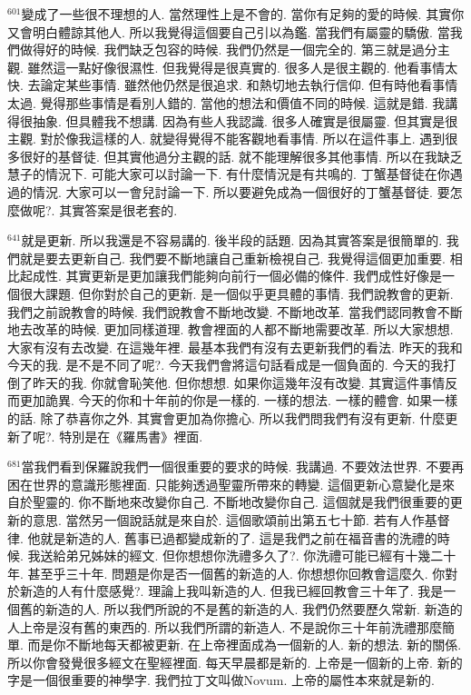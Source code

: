 \documentclass{book}
\begin{document}
$^{601}$變成了一些很不理想的人.
當然理性上是不會的.
當你有足夠的愛的時候.
其實你又會明白體諒其他人.
所以我覺得這個要自己引以為鑑.
當我們有屬靈的驕傲.
當我們做得好的時候.
我們缺乏包容的時候.
我們仍然是一個完全的.
第三就是過分主觀.
雖然這一點好像很濕性.
但我覺得是很真實的.
很多人是很主觀的.
他看事情太快.
去論定某些事情.
雖然他仍然是很追求.
和熱切地去執行信仰.
但有時他看事情太過.
覺得那些事情是看別人錯的.
當他的想法和價值不同的時候.
這就是錯.
我講得很抽象.
但具體我不想講.
因為有些人我認識.
很多人確實是很屬靈.
但其實是很主觀.
對於像我這樣的人.
就變得覺得不能客觀地看事情.
所以在這件事上.
遇到很多很好的基督徒.
但其實他過分主觀的話.
就不能理解很多其他事情.
所以在我缺乏慧子的情況下.
可能大家可以討論一下.
有什麼情況是有共鳴的.
丁蟹基督徒在你遇過的情況.
大家可以一會兒討論一下.
所以要避免成為一個很好的丁蟹基督徒.
要怎麼做呢?.
其實答案是很老套的.

$^{641}$就是更新.
所以我還是不容易講的.
後半段的話題.
因為其實答案是很簡單的.
我們就是要去更新自己.
我們要不斷地讓自己重新檢視自己.
我覺得這個更加重要.
相比起成性.
其實更新是更加讓我們能夠向前行一個必備的條件.
我們成性好像是一個很大課題.
但你對於自己的更新.
是一個似乎更具體的事情.
我們說教會的更新.
我們之前說教會的時候.
我們說教會不斷地改變.
不斷地改革.
當我們認同教會不斷地去改革的時候.
更加同樣道理.
教會裡面的人都不斷地需要改革.
所以大家想想.
大家有沒有去改變.
在這幾年裡.
最基本我們有沒有去更新我們的看法.
昨天的我和今天的我.
是不是不同了呢?.
今天我們會將這句話看成是一個負面的.
今天的我打倒了昨天的我.
你就會恥笑他.
但你想想.
如果你這幾年沒有改變.
其實這件事情反而更加詭異.
今天的你和十年前的你是一樣的.
一樣的想法.
一樣的體會.
如果一樣的話.
除了恭喜你之外.
其實會更加為你擔心.
所以我們問我們有沒有更新.
什麼更新了呢?.
特別是在《羅馬書》裡面.

$^{681}$當我們看到保羅說我們一個很重要的要求的時候.
我講過.
不要效法世界.
不要再困在世界的意識形態裡面.
只能夠透過聖靈所帶來的轉變.
這個更新心意變化是來自於聖靈的.
你不斷地來改變你自己.
不斷地改變你自己.
這個就是我們很重要的更新的意思.
當然另一個說話就是來自於.
這個歌頌前出第五七十節.
若有人作基督律.
他就是新造的人.
舊事已過都變成新的了.
這是我們之前在福音書的洗禮的時候.
我送給弟兄姊妹的經文.
但你想想你洗禮多久了?.
你洗禮可能已經有十幾二十年.
甚至乎三十年.
問題是你是否一個舊的新造的人.
你想想你回教會這麼久.
你對於新造的人有什麼感覺?.
理論上我叫新造的人.
但我已經回教會三十年了.
我是一個舊的新造的人.
所以我們所說的不是舊的新造的人.
我們仍然要歷久常新.
新造的人上帝是沒有舊的東西的.
所以我們所謂的新造人.
不是說你三十年前洗禮那麼簡單.
而是你不斷地每天都被更新.
在上帝裡面成為一個新的人.
新的想法.
新的關係.
所以你會發覺很多經文在聖經裡面.
每天早晨都是新的.
上帝是一個新的上帝.
新的字是一個很重要的神學字.
我們拉丁文叫做Novum.
上帝的屬性本來就是新的.
\end{document}

